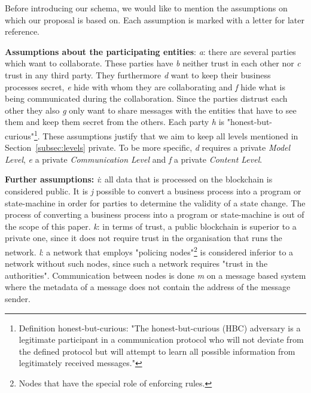 \documentclass[runningheads]{llncs}
\newcommand{\ber}[1]{\textit{#1}}
\newcommand{\refsec}[1]{Section~\ref{#1}}
\renewcommand{\bigbreak}{}
\begin{document}
Before introducing our schema, we would like to mention the assumptions on which our proposal is based on. Each assumption is marked with a letter for later reference. 



\bigbreak
\textbf{Assumptions about the participating entities}: \ber{a}: there are several parties which want to collaborate. These parties have \ber{b} neither trust in each other nor \ber{c} trust in any third party. They furthermore \ber{d} want to keep their business processes secret, \ber{e} hide with whom they are collaborating and \ber{f} hide what is being communicated during the collaboration. Since the parties distrust each other they also \ber{g} only want to share messages with the entities that have to see them and keep them secret from the others. Each party \ber{h} is "honest-but-curious"\footnote{Definition honest-but-curious: "The honest-but-curious (HBC) adversary is a legitimate participant in a communication protocol who will not deviate from the defined protocol but will attempt to learn all possible information from legitimately received messages."\cite{paverd2014modelling}}. These assumptions justify that we aim to keep all levels mentioned in \refsec{subsec:levels} private. To be more specific, \ber{d} requires a private \ber{Model Level}, \ber{e} a private \ber{Communication Level} and \ber{f} a private  \ber{Content Level}.

\bigbreak
\textbf{Further assumptions:}
\ber{i}: all data that is processed on the blockchain is considered public. It is \ber{j} possible to convert a business process into a program or state-machine in order for parties to determine the validity of a state change. The process of converting a business process into a program or state-machine is out of the scope of this paper. \ber{k}: in terms of trust, a public blockchain is superior to a private one, since it does not require trust in the organisation that runs the network. \ber{l}: a network that employs "policing nodes"\footnote{Nodes that have the special role of enforcing rules.} is considered inferior to a network without such nodes, since such a network requires "trust in the authorities". Communication between nodes is done \ber{m} on a message based system where the metadata of a message does not contain the address of the message sender.
\end{document}
